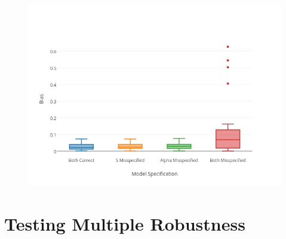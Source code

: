 \begin{figure}[h!] 
\includegraphics[width = \linewidth]{figures/boxplot.jpg}
\caption{}
\label{boxplot}
\end{figure} 



\newpage
\section{Testing Multiple Robustness} 


